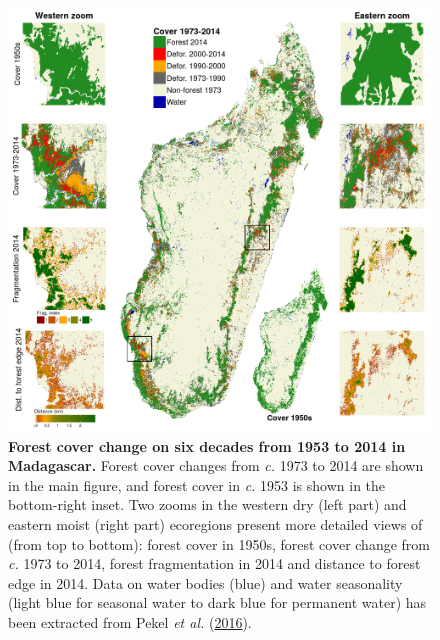 \documentclass[]{article}
\theoremstyle{definition}
\theoremstyle{definition}
\theoremstyle{definition}
\theoremstyle{remark}
\begin{document}
\begin{figure}
\centering
\includegraphics{figs/fig_fcc.png}
\caption{\textbf{Forest cover change on six decades from 1953 to 2014 in
Madagascar.} Forest cover changes from \emph{c.} 1973 to 2014 are shown
in the main figure, and forest cover in \emph{c.} 1953 is shown in the
bottom-right inset. Two zooms in the western dry (left part) and eastern
moist (right part) ecoregions present more detailed views of (from top
to bottom): forest cover in 1950s, forest cover change from \emph{c.}
1973 to 2014, forest fragmentation in 2014 and distance to forest edge
in 2014. Data on water bodies (blue) and water seasonality (light blue
for seasonal water to dark blue for permanent water) has been extracted
from Pekel \emph{et al.} (\protect\hyperlink{ref-Pekel2016}{2016}).}
\end{figure}
\end{document}
